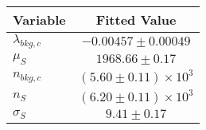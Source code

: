 \begin{tabular}[t]{lc}
\hline
Variable &Fitted Value\\
\hline\hline
$\lambda_{bkg,c}$&$-0.00457\pm0.00049$\\
\hline
$\mu_{S}$&$1968.66\pm0.17$\\
\hline
$n_{bkg,c}$&$(5.60\pm0.11)\times 10^3$\\
\hline
$n_{S}$&$(6.20\pm0.11)\times 10^3$\\
\hline
$\sigma_{S}$&$9.41\pm0.17$\\
\hline
\end{tabular}